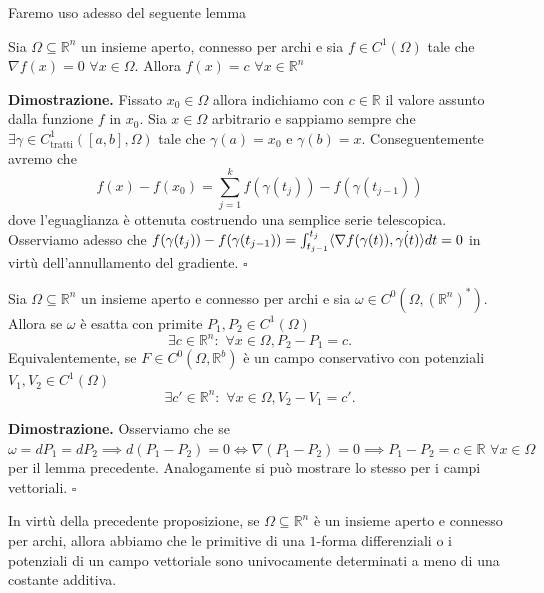 \vspace{0.5cm}
Faremo uso adesso del seguente lemma

\begin{lemma}[\textcolor{blue}{CF2}]
	Sia $\Omega \subseteq \mathbb{R}^n$ un insieme aperto, connesso per archi e sia $f \in C^1(\Omega)$ tale che $\nabla f(x) = 0 \, \, \forall x \in \Omega$. Allora
	$f(x)=c \, \, \forall x \in \mathbb{R}^n$
\end{lemma}

\noindent \textbf{Dimostrazione. }
	Fissato $x_0 \in \Omega$ allora indichiamo con $c \in \mathbb{R}$ il valore assunto dalla funzione $f$ in $x_0$. Sia $x \in \Omega$ arbitrario e sappiamo sempre che $\exists \gamma \in C^1_\text{tratti}([a, b], \Omega)$ tale che $\gamma(a) = x_0$ e $\gamma(b)=x$.
	Conseguentemente avremo che 
	$$
	f(x)-f(x_0) = \sum_{j=1}^k f(\gamma(t_j)) - f(\gamma(t_{j-1}))
	$$
	dove l'eguaglianza è ottenuta costruendo una semplice serie telescopica. Osserviamo adesso che $f(\gamma(t_j)) - f(\gamma(t_{j-1})) = \int_{t_{j-1}}^{t_j} \langle \nabla f(\gamma(t)), \dot{\gamma(t)} \rangle dt = 0$ in virtù dell'annullamento del gradiente.
\hfill $\square$

\vspace{0.5cm}
\begin{prop}
	Sia $\Omega \subseteq \mathbb{R}^n$ un insieme aperto e connesso per archi e sia $\omega \in C^0(\Omega, (\mathbb{R}^n)^*)$. Allora se $\omega$ è esatta con primite $P_1, P_2 \in C^1(\Omega)$
	$$
	\exists c \in \mathbb{R}^n : \, \, \forall x \in \Omega, P_2 - P_1 = c.
	$$
	Equivalentemente, se $F \in C^0(\Omega, \mathbb{R}^b)$ è un campo conservativo con potenziali $V_1, V_2 \in C^1(\Omega)$
	$$
	\exists c' \in \mathbb{R}^n : \, \, \forall x \in \Omega, V_2 - V_1 = c'.
	$$
\end{prop}

\noindent \textbf{Dimostrazione. }
Osserviamo che se $\omega = dP_1 = dP_2 \implies d(P_1 - P_2) = 0 \iff \nabla (P_1 - P_2) = 0 \implies P_1 - P_2 = c \in \mathbb{R} \, \, \forall x \in \Omega$ per il lemma precedente. Analogamente si può mostrare lo stesso per i campi vettoriali.
\hfill $\square$

\begin{remark}
In virtù della precedente proposizione, se $\Omega \subseteq \mathbb{R}^n$ è un insieme aperto e connesso per archi, allora abbiamo che le primitive di una $1$-forma differenziali o i potenziali di un campo vettoriale sono univocamente determinati
a meno di una costante additiva.
\end{remark}

